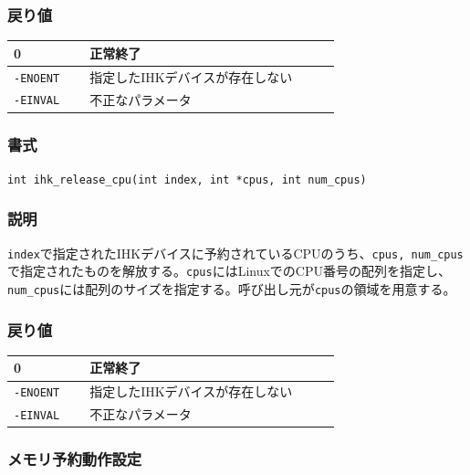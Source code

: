\documentclass[twoside,11pt,fleqn]{book}
\begin{document}
\subsubsection*{戻り値}{\quad}
\begin{table}[!h]
\footnotesize
\begin{tabular}{|p{0.20\linewidth}|p{0.66\linewidth}|} \hline
0&正常終了\\ \hline
\texttt{-ENOENT}&指定したIHKデバイスが存在しない\\ \hline
\texttt{-EINVAL}&不正なパラメータ\\ \hline
\end{tabular}
\vspace{-0em}
\end{table}
\FloatBarrier

\subsubsection{}
\subsubsection*{書式}{\quad} \texttt{int ihk\_release\_cpu(int index, int *cpus, int num\_cpus)}
\subsubsection*{説明}{\quad} \texttt{index}で指定されたIHKデバイスに予約されているCPUのうち、\texttt{cpus, num\_cpus}で指定されたものを解放する。\texttt{cpus}にはLinuxでのCPU番号の配列を指定し、\texttt{num\_cpus}には配列のサイズを指定する。呼び出し元が\texttt{cpus}の領域を用意する。

\subsubsection*{戻り値}{\quad}
\begin{table}[!h]
\footnotesize
\begin{tabular}{|p{0.20\linewidth}|p{0.66\linewidth}|} \hline
0&正常終了\\ \hline
\texttt{-ENOENT}&指定したIHKデバイスが存在しない\\ \hline
\texttt{-EINVAL}&不正なパラメータ\\ \hline
\end{tabular}
\vspace{-0em}
\end{table}
\FloatBarrier

\subsubsection{メモリ予約動作設定}\label{sec:balanced}
\end{document}
